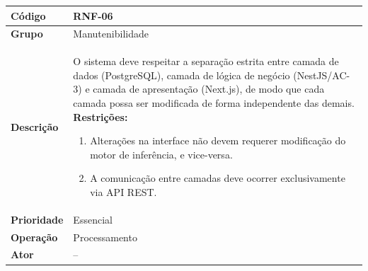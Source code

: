 \FloatBarrier
\begin{quadro}[htb]
  \caption{RNF-06 -- Separação estrita entre as três camadas arquiteturais}
  \label{quad:rnf06}
  \begin{tabular}{|p{3.2cm}|p{11.8cm}|}
    \hline
    \textbf{Código}     & RNF-06                                                                        \\ \hline
    \textbf{Grupo}      & Manutenibilidade                                                              \\ \hline
    \textbf{Descrição}  &
    O sistema deve respeitar a separação estrita entre camada de dados (PostgreSQL), camada de lógica de negócio (NestJS/AC-3) e camada de apresentação (Next.js), de modo que cada camada possa ser modificada de forma independente das demais.
    \textbf{Restrições:}
    \begin{enumerate}[nosep,leftmargin=1.2em,topsep=2pt,partopsep=0pt,parsep=0pt,itemsep=1pt]
      \item Alterações na interface não devem requerer modificação do motor de inferência, e vice-versa.
      \item A comunicação entre camadas deve ocorrer exclusivamente via API REST.
    \end{enumerate} \\ \hline
    \textbf{Prioridade} & Essencial                                                                     \\ \hline
    \textbf{Operação}   & Processamento                                                                 \\ \hline
    \textbf{Ator}       & --                                                                            \\ \hline
  \end{tabular}
\end{quadro}

